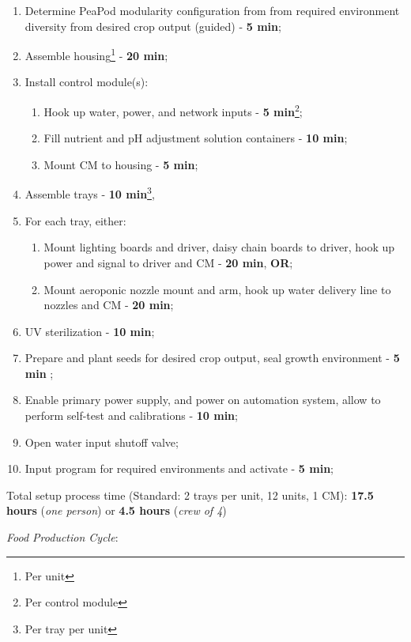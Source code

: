 \documentclass{report}
\begin{document}
\begin{enumerate}
    \item Determine PeaPod modularity configuration from from required environment diversity from desired crop output (guided) - \textbf{5 min};
    \item Assemble housing\footnote{Per unit} - \textbf{20 min};
    \item Install control module(s):
    \begin{enumerate}
        \item Hook up water, power, and network inputs - \textbf{5 min}\footnote{Per control module};
        \item Fill nutrient and pH adjustment solution containers - \textbf{10 min}\footnotemark[2];
        \item Mount CM to housing - \textbf{5 min}\footnotemark[2];
    \end{enumerate}
    \item Assemble trays - \textbf{10 min}\footnote{Per tray per unit}, 
    \item For each tray, either:
    \begin{enumerate}
        \item Mount lighting boards and driver, daisy chain boards to driver, hook up power and signal to driver and CM - \textbf{20 min}\footnotemark[3], \textbf{OR};
        \item Mount aeroponic nozzle mount and arm, hook up water delivery line to nozzles and CM - \textbf{20 min}\footnotemark[3];
    \end{enumerate}
    \item UV sterilization - \textbf{10 min};
    \item Prepare and plant seeds for desired crop output, seal growth environment - \textbf{5 min} \footnotemark[1];
    \item Enable primary power supply, and power on automation system, allow to perform self-test and calibrations - \textbf{10 min}\footnotemark[2];
    \item Open water input shutoff valve;
    \item Input program for required environments and activate - \textbf{5 min}\footnotemark[2];
\end{enumerate}

Total setup process time (Standard: 2 trays per unit, 12 units, 1 CM): \textbf{17.5 hours} (\textit{one person}) or \textbf{4.5 hours} (\textit{crew of 4})

\textit{Food Production Cycle}:
\end{document}
